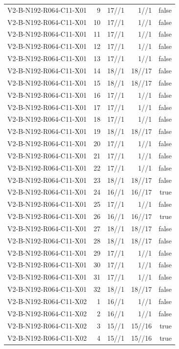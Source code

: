 {\begin{longtable}{lrrrr}
V2-B-N192-R064-C11-X01 & 9 & 17//1 & 1//1 & false \\
V2-B-N192-R064-C11-X01 & 10 & 17//1 & 1//1 & false \\
V2-B-N192-R064-C11-X01 & 11 & 17//1 & 1//1 & false \\
V2-B-N192-R064-C11-X01 & 12 & 17//1 & 1//1 & false \\
V2-B-N192-R064-C11-X01 & 13 & 17//1 & 1//1 & false \\
V2-B-N192-R064-C11-X01 & 14 & 18//1 & 18//17 & false \\
V2-B-N192-R064-C11-X01 & 15 & 18//1 & 18//17 & false \\
V2-B-N192-R064-C11-X01 & 16 & 17//1 & 1//1 & false \\
V2-B-N192-R064-C11-X01 & 17 & 17//1 & 1//1 & false \\
V2-B-N192-R064-C11-X01 & 18 & 17//1 & 1//1 & false \\
V2-B-N192-R064-C11-X01 & 19 & 18//1 & 18//17 & false \\
V2-B-N192-R064-C11-X01 & 20 & 17//1 & 1//1 & false \\
V2-B-N192-R064-C11-X01 & 21 & 17//1 & 1//1 & false \\
V2-B-N192-R064-C11-X01 & 22 & 17//1 & 1//1 & false \\
V2-B-N192-R064-C11-X01 & 23 & 18//1 & 18//17 & false \\
V2-B-N192-R064-C11-X01 & 24 & 16//1 & 16//17 & true \\
V2-B-N192-R064-C11-X01 & 25 & 17//1 & 1//1 & false \\
V2-B-N192-R064-C11-X01 & 26 & 16//1 & 16//17 & true \\
V2-B-N192-R064-C11-X01 & 27 & 18//1 & 18//17 & false \\
V2-B-N192-R064-C11-X01 & 28 & 18//1 & 18//17 & false \\
V2-B-N192-R064-C11-X01 & 29 & 17//1 & 1//1 & false \\
V2-B-N192-R064-C11-X01 & 30 & 17//1 & 1//1 & false \\
V2-B-N192-R064-C11-X01 & 31 & 17//1 & 1//1 & false \\
V2-B-N192-R064-C11-X01 & 32 & 18//1 & 18//17 & false \\
V2-B-N192-R064-C11-X02 & 1 & 16//1 & 1//1 & false \\
V2-B-N192-R064-C11-X02 & 2 & 16//1 & 1//1 & false \\
V2-B-N192-R064-C11-X02 & 3 & 15//1 & 15//16 & true \\
V2-B-N192-R064-C11-X02 & 4 & 15//1 & 15//16 & true \\

\end{longtable}}
